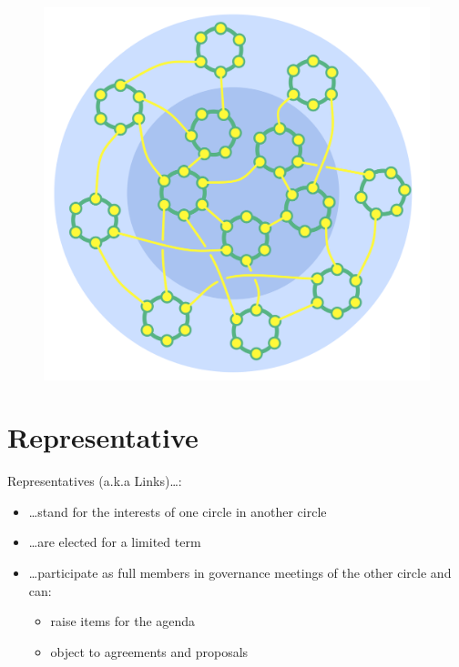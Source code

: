 \begin{figure}[htbp]
\centering
\includegraphics[keepaspectratio,width=\textwidth,height=0.75\textheight]{img/structural-patterns/peach-organization.png}
\end{figure}

\section{Representative}
\label{representative}

Representatives (a.k.a Links){\ldots}:

\begin{itemize}
\item {\ldots}stand for the interests of one circle in another circle

\item {\ldots}are elected for a limited term

\item {\ldots}participate as full members in governance meetings of the other circle and can:

\begin{itemize}
\item raise items for the agenda

\item object to agreements and proposals

\end{itemize}

\end{itemize}

